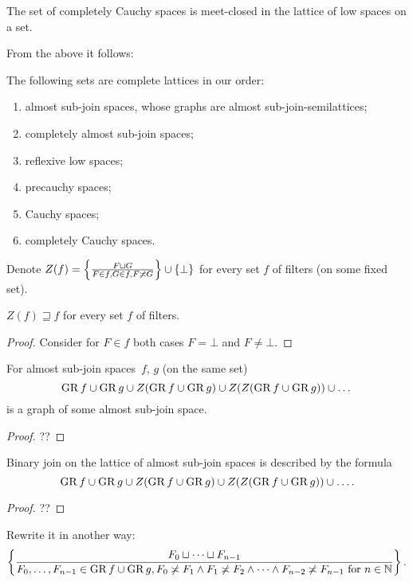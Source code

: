 \begin{cor}
The set of completely Cauchy spaces is meet-closed in the lattice of low spaces on a set.
\end{cor}

From the above it follows:

\begin{obvious}
The following sets are complete lattices in our order:
\begin{enumerate}
\item almost sub-join spaces, whose graphs are almost sub-join-semilattices;
\item completely almost sub-join spaces;
\item reflexive low spaces;
\item precauchy spaces;
\item Cauchy spaces;
\item completely Cauchy spaces.
\end{enumerate}
\end{obvious}

Denote $Z(f)=\left\{ \frac{F\sqcup G}{F\in f,G\in f,F\not\asymp G}\right\}\cup\{\bot\}$ for every set $f$ of filters (on some fixed set).

\begin{prop}
$Z(f)\sqsupseteq f$ for every set $f$ of filters.
\end{prop}

\begin{proof}
Consider for $F\in f$ both cases $F=\bot$ and $F\ne\bot$.
\end{proof}

\begin{lem}
For almost sub-join spaces~$f$, $g$ (on the same set)
\[
\operatorname{GR} f\cup\operatorname{GR} g\cup Z(\operatorname{GR} f\cup\operatorname{GR} g)\cup Z(Z(\operatorname{GR} f\cup\operatorname{GR} g))\cup\dots
\]
is a graph of some almost sub-join space.
\end{lem}

\begin{proof}
??
\end{proof}

\begin{prop}
Binary join on the lattice of almost sub-join spaces is described by the formula
\[
\operatorname{GR} f\cup\operatorname{GR} g\cup Z(\operatorname{GR} f\cup\operatorname{GR} g)\cup Z(Z(\operatorname{GR} f\cup\operatorname{GR} g))\cup\dots.
\]
\end{prop}

\begin{proof}
??
\end{proof}

Rewrite it in another way:
\[
\left\{ \frac{F_0\sqcup\dots\sqcup F_{n-1}}{F_0,\dots,F_{n-1}\in\operatorname{GR} f\cup\operatorname{GR} g,F_0\not\asymp F_1\land F_1\not\asymp F_2\land\dots\land F_{n-2}\not\asymp F_{n-1} \text{ for } n\in\mathbb{N}}\right\}.
\]

